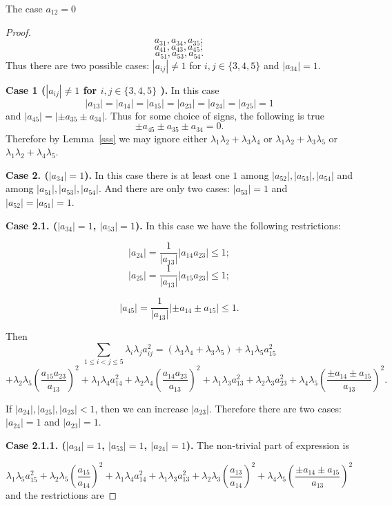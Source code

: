 \documentclass[12pt]{article}
\begin{document}
\begin{section}{The case \texorpdfstring{$a_{12} = 0$}{Lg}}
\begin{proof}
         $$
            a_{31},a_{34},a_{35};
        $$
        $$
            a_{41},a_{43},a_{45};
        $$
        $$
            a_{51},a_{53},a_{54}.
        $$
    Thus there are two possible  cases: $|a_{ij}|\neq 1$ for $i,j\in \{3,4,5\}$ and $|a_{34}|=1$.     

    \textbf{Case 1 ($|a_{ij}|\neq 1$ for $i,j\in \{3,4,5\}$ ).} In this case 
    $$
        |a_{13}|=|a_{14}|=|a_{15}|=|a_{23}|=|a_{24}|=|a_{25}|=1
    $$
    and $|a_{45}| = |\pm a_{35} \pm a_{34}|.$ Thus for some choice of signs, the following is true $$\pm a_{45} \pm a_{35} \pm a_{34} = 0.$$ 
    Therefore by Lemma~\ref{sss} we may ignore either $\lambda_{1}\lambda_{2} + \lambda_{3}\lambda_{4}$ or  $\lambda_{1}\lambda_{2} + \lambda_{3}\lambda_{5}$ or $\lambda_{1}\lambda_{2} + \lambda_{4}\lambda_{5}$.

    \textbf{Case 2. ($|a_{34}|=1$).} In this case there is at least one $1$ among $|a_{52}|,|a_{53}|,|a_{54}|$ and among $|a_{51}|,|a_{53}|,|a_{54}|.$ And there are only two cases: $|a_{53}|=1$ and $|a_{52}|=|a_{51}|=1.$

    \textbf{Case 2.1. ($|a_{34}|=1$, $|a_{53}|=1$).} In this case we have the following restrictions:

    $$
            |a_{24}| = \frac{1}{|a_{13}|}|a_{14}a_{23}|\leq 1; 
        $$
        $$
            |a_{25}| = \frac{1}{|a_{13}|}|a_{15}a_{23}|\leq 1;
        $$

        $$
            |a_{45}| = \frac{1}{|a_{13}|}|\pm a_{14} \pm  a_{15}|\leq 1.
        $$

    Then 
    $$
        \sum_{1\leq i < j \leq 5} \lambda_{i}\lambda_{j}a_{ij}^2 = (\lambda_{3}\lambda_{4} + \lambda_{3}\lambda_{5}) + \lambda_{1}\lambda_{5}a_{15}^2  $$
        $$     
 + \lambda_{2}\lambda_{5}\left(\frac{a_{15}a_{23}}{a_{13}}\right)^2 + \lambda_{1}\lambda_{4}a_{14}^2 + \lambda_{2}\lambda_{4} \left(\frac{a_{14}a_{23}}{a_{13}}\right)^2 + \lambda_{1}\lambda_{3}a_{13}^2 + \lambda_{2}\lambda_{3}a_{23}^2 +\lambda_{4}\lambda_{5}\left(\frac{\pm a_{14} \pm a_{15}}{a_{13}}\right)^2.   $$

    If $|a_{24}|,|a_{25}|,|a_{23}|<1 $, then we can increase $|a_{23}|.$ Therefore there are two cases: $|a_{24}|=1$ and $|a_{23}|=1$.

     \textbf{Case 2.1.1. ($|a_{34}|=1$, $|a_{53}|=1$, $|a_{24}|=1$).} The non-trivial part of expression is 

            $$     
    \lambda_{1}\lambda_{5}a_{15}^2 + \lambda_{2}\lambda_{5}\left(\frac{a_{15}}{a_{14}}\right)^2 + \lambda_{1}\lambda_{4}a_{14}^2 + \lambda_{1}\lambda_{3}a_{13}^2 + \lambda_{2}\lambda_{3}\left(\frac{a_{13}}{a_{14}}\right)^2 +\lambda_{4}\lambda_{5}\left(\frac{\pm a_{14} \pm a_{15}}{a_{13}}\right)^2   $$
    and the restrictions are
    

\end{proof}
\end{section}
\end{document}
